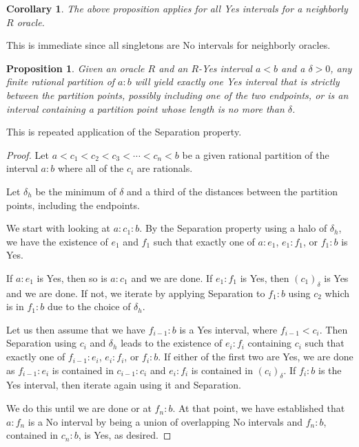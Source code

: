 \documentclass[12pt]{article}
\newtheorem{corollary}{Corollary}[subsection]
\newtheorem{proposition}{Proposition}[subsection]
\begin{document}
\begin{corollary}
    The above proposition applies for all Yes intervals for a neighborly $R$ oracle. 
\end{corollary}

This is immediate since all singletons are No intervals for neighborly oracles. 

\begin{proposition}\label{pr:multi}
Given an oracle $R$ and an $R$-Yes interval $a\lt b$ and a $\delta>0$, any finite rational partition of $a:b$ will yield exactly one Yes interval that is strictly between the partition points, possibly including one of the two endpoints, or is an interval containing a partition point whose length is no more than $\delta$.
\end{proposition}

This is repeated application of the Separation property. 

\begin{proof}

Let $a < c_1 < c_2 < c_3 < \cdots < c_n < b$ be a given rational partition of the interval $a:b$ where all of the $c_i$ are rationals. 

Let $\delta_h$ be the minimum of $\delta$ and a third of the distances between the partition points, including the endpoints. 

We start with looking at $a:c_1:b$. By the Separation property using a halo of $\delta_h$, we have the existence of $e_1$ and $f_1$ such that exactly one of $a:e_1$, $e_1:f_1$, or $f_1:b$ is Yes. 

If $a:e_1$ is Yes, then so is $a:c_1$ and we are done. If $e_1:f_1$ is Yes, then $(c_1)_\delta$ is Yes and we are done. If not, we iterate by applying Separation to $f_1:b$ using $c_2$ which is in $f_1:b$ due to the choice of $\delta_h$. 

Let us then assume that we have $f_{i-1}:b$ is a Yes interval, where $f_{i-1} < c_i$.  Then Separation using $c_i$ and $\delta_h$ leads to the existence of $e_i:f_i$ containing $c_i$ such that exactly one of $f_{i-1}:e_i$, $e_i:f_i$, or $f_i:b$. If either of the first two are Yes, we are done as $f_{i-1}:e_i$ is contained in $c_{i-1}:c_i$ and $e_i:f_i$ is contained in $(c_i)_\delta$. If $f_i:b$ is the Yes interval, then iterate again using it and Separation. 

We do this until we are done or at $f_n:b$. At that point, we have established that $a:f_n$ is a No interval by being a union of overlapping No intervals and $f_n:b$, contained in $c_n:b$, is Yes, as desired.
\end{proof}
\end{document}
